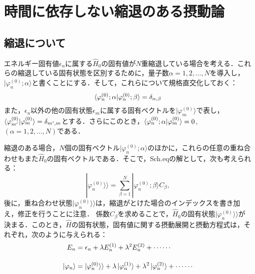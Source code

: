 \section{時間に依存しない縮退のある摂動論}
\subsection{縮退について}
エネルギー固有値$\epsilon_n$に属する$\hat{H}_0$の固有値が$N$重縮退している場合を考える．これらの縮退している固有状態を区別するために，量子数$\alpha=1,2,\ldots,N$を導入し，$|\varphi^{(0)}_n;\alpha\rangle$と書くことにする．そして，これらについて規格直交化しておく：
\begin{equation}
    \braket{\varphi^{(0)}_n;\alpha|\varphi^{(0)}_n;\beta} = \delta_{\alpha,\beta}
\end{equation}
また，$\epsilon_{n}$以外の他の固有状態$\epsilon_m$に属する固有ベクトルを$|\varphi^{(0)}_m\rangle$で表し，$\braket{\varphi^{(0)}_{m^\prime}|\varphi^{(0)}_m}=\delta_{m^\prime,m}$とする．さらにこのとき，$\braket{\varphi^{(0)}_n;\alpha|\varphi^{(0)}_m}=0$, $(\alpha=1,2,\ldots,N)$である．

縮退のある場合，$N$個の固有ベクトル$|\varphi^{(0)}_n;\alpha\rangle$のほかに，これらの任意の重ね合わせもまた$\hat{H}_0$の固有ベクトルである．そこで，Sch.eqの解として，次も考えられる：
\begin{equation}\label{Eq:dege_state_superposition}
    |\varphi^{(0)}_n\rangle\rangle = \sum_{\beta=1}^N |\varphi^{(0)}_n;\beta\rangle C_{\beta},
\end{equation}
後に，重ね合わせ状態$|\varphi^{(0)}_n\rangle\rangle$は，縮退がとけた場合のインデックスを書き加え，修正を行うことに注意．
係数$C_{\beta}$を求めることで，$\hat{H}_0$の固有状態$|\varphi^{(0)}_n\rangle\rangle$が決まる．このとき，$\hat{H}$の固有状態，固有値に関する摂動展開と摂動方程式は，それぞれ，次のように与えられる：
\begin{align}
\label{Ee}
E_n&=\epsilon_n+\lambda E^{(1)}_n+\lambda^2E^{(2)}_n+\cdots\cdots\\[10pt]
\label{pe}
\ket{\varphi_n}&=|\varphi^{(0)}_n\rangle\rangle +\lambda \ket{\varphi^{(1)}_n}+\lambda^2\ket{\varphi^{(2)}_n}+\cdots\cdots
\end{align}

